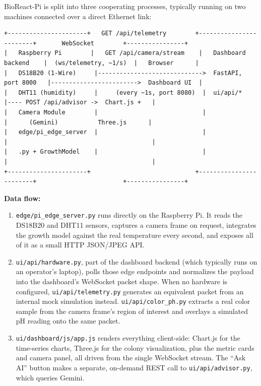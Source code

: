 \documentclass[11pt]{article}
\begin{document}
BioReact-Pi is split into three cooperating processes, typically running on two machines connected over a direct Ethernet link:

\begin{lstlisting}
+----------------------+   GET /api/telemetry        +------------------------+       WebSocket        +----------------+
|   Raspberry Pi        |   GET /api/camera/stream    |   Dashboard backend    |  (ws/telemetry, ~1/s)  |   Browser      |
|   DS18B20 (1-Wire)     |----------------------------->  FastAPI, port 8000   |------------------------>  Dashboard UI  |
|   DHT11 (humidity)     |     (every ~1s, port 8080)  |  ui/api/*              |---- POST /api/advisor ->  Chart.js +   |
|   Camera Module        |                             |                        |      (Gemini)           Three.js      |
|   edge/pi_edge_server  |                             |                        |                                        |
|   .py + GrowthModel    |                             |                        |                                        |
+----------------------+                             +------------------------+                        +----------------+
\end{lstlisting}

\textbf{Data flow:}
\begin{enumerate}
    \item \texttt{edge/pi\_edge\_server.py} runs directly on the Raspberry Pi. It reads the DS18B20 and DHT11 sensors, captures a camera frame on request, integrates the growth model against the real temperature every second, and exposes all of it as a small HTTP JSON/JPEG API.
    \item \texttt{ui/api/hardware.py}, part of the dashboard backend (which typically runs on an operator's laptop), polls those edge endpoints and normalizes the payload into the dashboard's WebSocket packet shape. When no hardware is configured, \texttt{ui/api/telemetry.py} generates an equivalent packet from an internal mock simulation instead. \texttt{ui/api/color\_ph.py} extracts a real color sample from the camera frame's region of interest and overlays a simulated pH reading onto the same packet.
    \item \texttt{ui/dashboard/js/app.js} renders everything client-side: Chart.js for the time-series charts, Three.js for the colony visualization, plus the metric cards and camera panel, all driven from the single WebSocket stream. The ``Ask AI'' button makes a separate, on-demand REST call to \texttt{ui/api/advisor.py}, which queries Gemini.
\end{enumerate}
\end{document}
